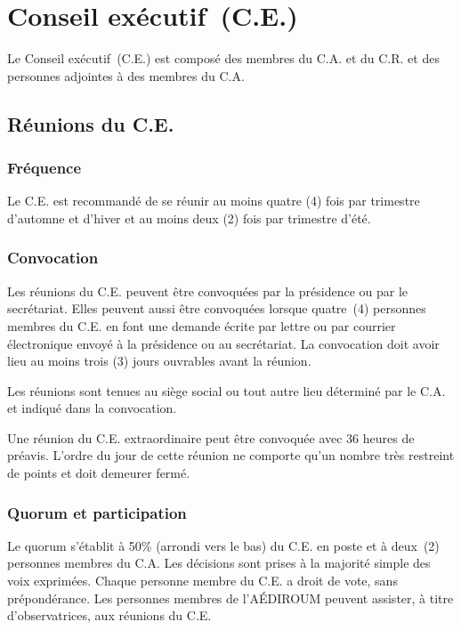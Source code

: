 \documentclass{aediroum}
\begin{document}
\section{Conseil exécutif~(C.E.)}
Le Conseil exécutif~(C.E.) est composé des membres du C.A. et du C.R. et des personnes
adjointes à des membres du C.A.

\subsection{Réunions du C.E.}\label{sec:reunions-du-conseil-dadministration}
\subsubsection{Fréquence}\label{sec:frequence}

Le C.E. est recommandé de se réunir au moins quatre (4) fois par trimestre d'automne et d'hiver et au moins deux (2) fois par trimestre d'été.

\subsubsection{Convocation}\label{sec:convocation-administration}

Les réunions du C.E. peuvent être convoquées par la présidence ou par le secrétariat. Elles peuvent aussi être convoquées lorsque quatre~(4) personnes membres du C.E. en font une demande écrite par lettre ou par courrier électronique envoyé à la présidence ou au secrétariat. La convocation doit avoir lieu au moins trois (3) jours ouvrables avant la réunion.

Les réunions sont tenues au siège social ou tout autre lieu déterminé par le C.A. et indiqué dans la convocation.

Une réunion du C.E. extraordinaire peut être convoquée avec 36 heures de préavis. L'ordre du jour de cette réunion ne comporte qu'un nombre très restreint de points et doit demeurer fermé.

\subsubsection{Quorum et participation}\label{sec:quorum-et-participation}

Le quorum s'établit à 50\% (arrondi vers le bas) du C.E. en poste et à deux~(2) personnes membres du C.A. Les décisions sont prises à la majorité simple des voix exprimées. Chaque personne membre du C.E. a droit de vote, sans prépondérance. Les personnes membres de l'AÉDIROUM peuvent assister, à titre d'observatrices, aux réunions du C.E.
\end{document}
